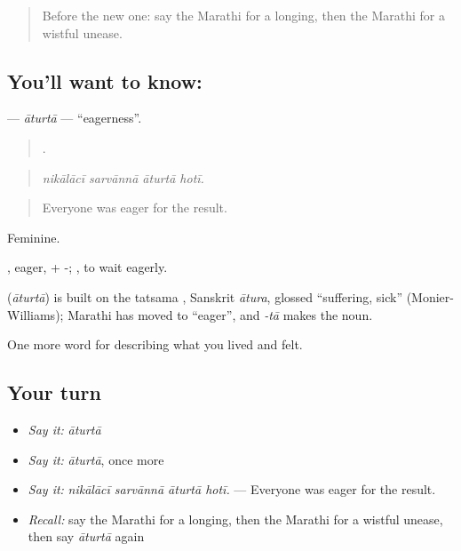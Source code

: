 \label{lesson:MR-C459-aturta}



\begin{quote}
Before the new one: say the Marathi for a longing, then the Marathi for a wistful unease.
\end{quote}

\subsection*{You'll want to know: }
\textbf{} — \emph{āturtā} — \textquotedblleft{}eagerness\textquotedblright{}.

\begin{quote}
   .
\end{quote}

\begin{quote}
\emph{nikālācī sarvānnā āturtā hotī.}
\end{quote}

\begin{quote}
Everyone was eager for the result.
\end{quote}

Feminine.

, eager, + -;   , to wait eagerly.

\begin{cousinweb}
\textbf{} (\emph{āturtā}) is built on the tatsama , Sanskrit \emph{ātura}, glossed \textquotedblleft{}suffering, sick\textquotedblright{} (Monier-Williams); Marathi  has moved to \textquotedblleft{}eager\textquotedblright{}, and \emph{-tā} makes the noun.
\end{cousinweb}

\begin{grammarlens}[title={What you've built}]
One more word for describing what you lived and felt.
\end{grammarlens}

\subsection*{Your turn}
\begin{itemize}
\raggedright
  \item \emph{Say it:} \emph{āturtā}
  \item \emph{Say it:} \emph{āturtā}, once more
  \item \emph{Say it:} \emph{nikālācī sarvānnā āturtā hotī.} — Everyone was eager for the result.
  \item \emph{Recall:} say the Marathi for a longing, then the Marathi for a wistful unease, then say \emph{āturtā} again
\end{itemize}

